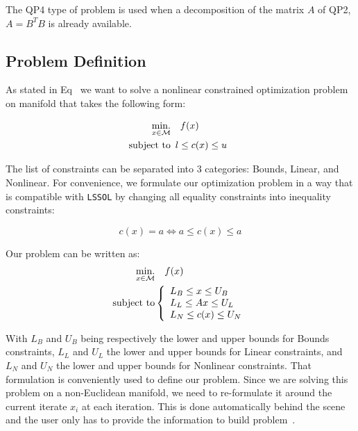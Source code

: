 The QP4 type of problem is used when a decomposition of the matrix $A$ of QP2, $A=B^T B$ is already available.

\subsection{Problem Definition}
\label{sub:problem_definition}

As stated in Eq~ we want to solve a nonlinear constrained optimization problem on manifold that takes the following form:

\begin{align}
  \operatorname*{min.}_{x \in \mathcal{M}} & \quad f(x)\\
  \text{subject to}&
  \begin{array}{lr}
    l \leq c(x) \leq u \nonumber
  \end{array}
\end{align}

The list of constraints can be separated into 3 categories: Bounds, Linear, and Nonlinear.
For convenience, we formulate our optimization problem in a way that is compatible with {\tt LSSOL} by changing all equality constraints into inequality constraints:

\begin{equation}
  c(x) = a \Leftrightarrow a \leq c(x) \leq a
\end{equation}

Our problem can be written as:
\begin{align}
\label{eq:optim_problem_on_manifold}
  \operatorname*{min.}_{x \in \mathcal{M}} & \quad f(x)\\ \nonumber
  \text{subject to}&\left\{
  \begin{array}{lr}
    L_B \leq x \leq U_B \\
    L_L \leq Ax \leq U_L \\
    L_N \leq c(x) \leq U_N
  \end{array}\right.
\end{align}

With $L_B$ and $U_B$ being respectively the lower and upper bounds for Bounds constraints, $L_L$ and $U_L$ the lower and upper bounds for Linear constraints, and $L_N$ and $U_N$ the lower and upper bounds for Nonlinear constraints.
That formulation is conveniently used to define our problem.
Since we are solving this problem on a non-Euclidean manifold, we need to re-formulate it around the current iterate $x_i$ at each iteration.
This is done automatically behind the scene and the user only has to provide the information to build problem~.

